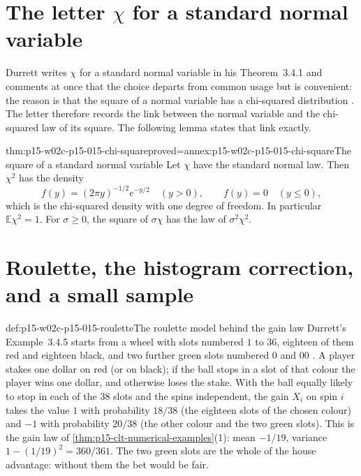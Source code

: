 \section{The letter \texorpdfstring{\(\chi\)}{chi} for a standard normal variable}
\label{sec:p15-w02c-p15-015-chi}

Durrett writes \(\chi\) for a standard normal variable in his
Theorem~3.4.1 and comments at once that the choice departs from common
usage but is convenient: the reason is that the square of a normal
variable has a chi-squared distribution
\cite[p.~144]{DurrettPTEAuthor2019}. The letter therefore records the
link between the normal variable and the chi-squared law of its
square. The following lemma states that link exactly.

\begin{hblemma}{thm:p15-w02c-p15-015-chi-square}{proved=annex:p15-w02c-p15-015-chi-square}{The square of a standard normal variable}
Let \(\chi\) have the standard normal law. Then \(\chi^2\) has the
density
\[
 f(y)=(2\pi y)^{-1/2}e^{-y/2}\quad(y>0),\qquad f(y)=0\quad(y\leq0),
\]
which is the chi-squared density with one degree of freedom. In
particular \(\mathbb E\chi^2=1\). For \(\sigma\geq0\), the square of
\(\sigma\chi\) has the law of \(\sigma^2\chi^2\).
\end{hblemma}

\section{Roulette, the histogram correction, and a small sample}
\label{sec:p15-w02c-p15-015-histogram}

\begin{hbexample}{def:p15-w02c-p15-015-roulette}{The roulette model behind the gain law}
Durrett's Example~3.4.5 starts from a wheel with slots numbered
\(1\) to \(36\), eighteen of them red and eighteen black, and two
further green slots numbered \(0\) and \(00\)
\cite[p.~145]{DurrettPTEAuthor2019}. A player stakes one dollar on red
(or on black); if the ball stops in a slot of that colour the player
wins one dollar, and otherwise loses the stake. With the ball equally
likely to stop in each of the \(38\) slots and the spins independent,
the gain \(X_i\) on spin \(i\) takes the value \(1\) with probability
\(18/38\) (the eighteen slots of the chosen colour) and \(-1\) with
probability \(20/38\) (the other colour and the two green slots). This
is the gain law of \cref{thm:p15-clt-numerical-examples}(1): mean
\(-1/19\), variance \(1-(1/19)^2=360/361\). The two green slots are the
whole of the house advantage: without them the bet would be fair.
\end{hbexample}

